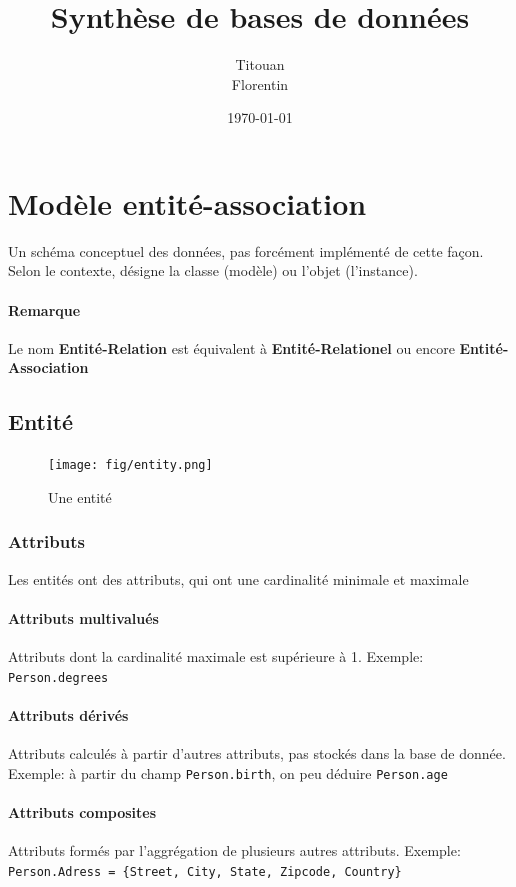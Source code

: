 \documentclass[a4paper]{article}
\author{Titouan \bsc{Christophe}\\Florentin \bsc{Hennecker}}
\title{Synthèse de bases de données}
\date{\today}
\begin{document}
\maketitle
\tableofcontents

\section{Modèle entité-association}
Un schéma conceptuel des données, pas forcément implémenté de cette façon.
Selon le contexte, désigne la classe (modèle) ou l'objet (l'instance).

\paragraph{Remarque} Le nom \textbf{Entité-Relation} est équivalent à
\textbf{Entité-Relationel} ou encore \textbf{Entité-Association}

\subsection{Entité}
\begin{figure}[H]
    \center
    \texttt{[image: fig/entity.png]}
    \caption{Une entité}
\end{figure}

\subsubsection{Attributs}
Les entités ont des attributs, qui ont une cardinalité minimale et maximale

\paragraph{Attributs multivalués}
Attributs dont la cardinalité maximale est supérieure à 1.
Exemple: \texttt{Person.degrees}

\paragraph{Attributs dérivés}
Attributs calculés à partir d'autres attributs, pas stockés dans la base de donnée.
Exemple: à partir du champ \texttt{Person.birth}, on peu déduire \texttt{Person.age}

\paragraph{Attributs composites}
Attributs formés par l'aggrégation de plusieurs autres attributs.
Exemple: \texttt{Person.Adress = \{Street, City, State, Zipcode, Country\}}
\end{document}
